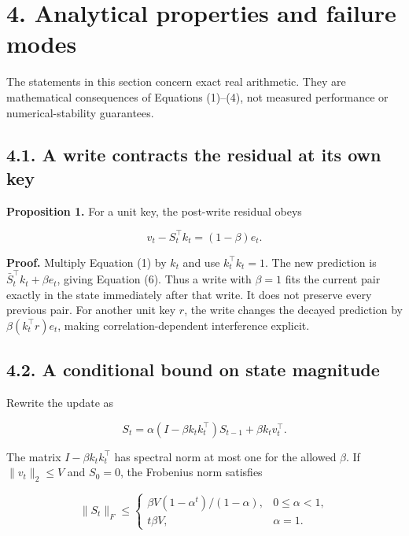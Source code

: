 \documentclass[11pt,a4paper]{article}
\begin{document}
\section{4. Analytical properties and failure modes}\label{analytical-properties-and-failure-modes}

The statements in this section concern exact real arithmetic. They are mathematical consequences of Equations (1)--(4), not measured performance or numerical-stability guarantees.

\subsection{4.1. A write contracts the residual at its own key}\label{a-write-contracts-the-residual-at-its-own-key}

\textbf{Proposition 1.} For a unit key, the post-write residual obeys

\nopagebreak[4]

\[
v_t-S_t^{\top}k_t=(1-\beta)e_t. \tag{6}
\]

\textbf{Proof.} Multiply Equation (1) by \(k_t\) and use \(k_t^{\top}k_t=1\). The new prediction is \(\bar S_t^{\top}k_t+\beta e_t\), giving Equation (6). Thus a write with \(\beta=1\) fits the current pair exactly in the state immediately after that write. It does not preserve every previous pair. For another unit key \(r\), the write changes the decayed prediction by \(\beta(k_t^{\top}r)e_t\), making correlation-dependent interference explicit.

\subsection{4.2. A conditional bound on state magnitude}\label{a-conditional-bound-on-state-magnitude}

Rewrite the update as

\nopagebreak[4]

\[
S_t=\alpha(I-\beta k_tk_t^{\top})S_{t-1}+\beta k_tv_t^{\top}. \tag{7}
\]

The matrix \(I-\beta k_tk_t^{\top}\) has spectral norm at most one for the allowed \(\beta\). If \(\|v_t\|_2\leq V\) and \(S_0=0\), the Frobenius norm satisfies

\nopagebreak[4]

\[
\|S_t\|_F\leq
\begin{cases}
\beta V(1-\alpha^t)/(1-\alpha), & 0\leq\alpha<1,\\
t\beta V, & \alpha=1.
\end{cases} \tag{8}
\]
\end{document}
